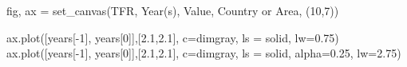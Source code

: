 \documentclass[
  letterpaper,
  DIV=11,
  numbers=noendperiod]{scrreprt}
\newenvironment{Shaded}{\begin{snugshade}}{\end{snugshade}}
\newcommand{\DecValTok}[1]{\textcolor[rgb]{0.68,0.00,0.00}{#1}}
\newcommand{\FloatTok}[1]{\textcolor[rgb]{0.68,0.00,0.00}{#1}}
\newcommand{\NormalTok}[1]{\textcolor[rgb]{0.00,0.23,0.31}{#1}}
\newcommand{\OperatorTok}[1]{\textcolor[rgb]{0.37,0.37,0.37}{#1}}
\newcommand{\StringTok}[1]{\textcolor[rgb]{0.13,0.47,0.30}{#1}}
\begin{document}
\begin{Shaded}
\begin{Highlighting}[]
\NormalTok{fig, ax }\OperatorTok{=}\NormalTok{ set\_canvas(TFR, }\StringTok{\textquotesingle{}Year(s)\textquotesingle{}}\NormalTok{, }\StringTok{\textquotesingle{}Value\textquotesingle{}}\NormalTok{, }\StringTok{\textquotesingle{}Country or Area\textquotesingle{}}\NormalTok{, (}\DecValTok{10}\NormalTok{,}\DecValTok{7}\NormalTok{))}

\NormalTok{ax.plot([years[}\OperatorTok{{-}}\DecValTok{1}\NormalTok{], years[}\DecValTok{0}\NormalTok{]],[}\FloatTok{2.1}\NormalTok{,}\FloatTok{2.1}\NormalTok{], c}\OperatorTok{=}\StringTok{\textquotesingle{}dimgray\textquotesingle{}}\NormalTok{, ls }\OperatorTok{=} \StringTok{\textquotesingle{}solid\textquotesingle{}}\NormalTok{, lw}\OperatorTok{=}\FloatTok{0.75}\NormalTok{)}
\NormalTok{ax.plot([years[}\OperatorTok{{-}}\DecValTok{1}\NormalTok{], years[}\DecValTok{0}\NormalTok{]],[}\FloatTok{2.1}\NormalTok{,}\FloatTok{2.1}\NormalTok{], c}\OperatorTok{=}\StringTok{\textquotesingle{}dimgray\textquotesingle{}}\NormalTok{, ls }\OperatorTok{=} \StringTok{\textquotesingle{}solid\textquotesingle{}}\NormalTok{, alpha}\OperatorTok{=}\FloatTok{0.25}\NormalTok{, lw}\OperatorTok{=}\FloatTok{2.75}\NormalTok{) }


\end{Highlighting}
\end{Shaded}
\end{document}
